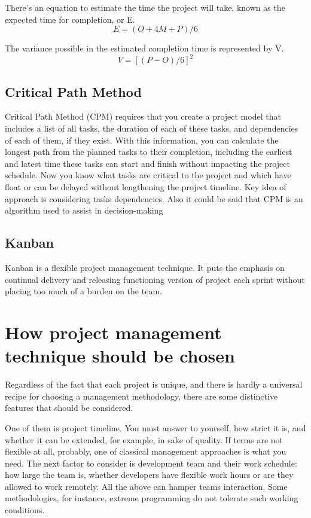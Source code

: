 \documentclass[conference]{IEEEtran}
\begin{document}
    There's an equation to estimate the time the project will take, known as the expected time for completion, or E.
    \begin{equation}
        E=(O + 4M + P)/6\label{eq}
    \end{equation}

    The variance possible in the estimated completion time is represented by V.
    \begin{equation}
        V=[(P - O)/ 6]^2\label{eq}
    \end{equation}

    \subsection{Critical Path Method}\label{subsec:critical-path-method}
    Critical Path Method (CPM) requires that you create a project model that includes a list of all tasks, the duration of each of these tasks, and dependencies of each of them, if they exist.
    With this information, you can calculate the longest path from the planned tasks to their completion, including the earliest and latest time these tasks can start and finish without impacting the project schedule.
    Now you know what tasks are critical to the project and which have float or can be delayed without lengthening the project timeline.
    Key idea of approach is considering tasks dependencies.
    Also it could be said that CPM is an algorithm used to assist in decision-making

    \subsection{Kanban}\label{subsec:kanban}
    Kanban is a flexible project management technique.
    It puts the emphasis on continual delivery and releasing functioning version of project each sprint without placing too much of a burden on the team.

    \section{How project management technique should be chosen}\label{sec:how-project-management-technique-should-be-chosen}
    Regardless of the fact that each project is unique, and there is hardly a universal recipe for choosing a management methodology, there are some distinctive features that should be considered.

    One of them is project timeline.
    You must answer to yourself, how strict it is, and whether it can be extended, for example, in sake of quality.
    If terms are not flexible at all, probably, one of classical management approaches is what you need.
    The next factor to consider is development team and their work schedule: how large the team is, whether developers have flexible work hours or are they allowed to work remotely.
    All the above can hamper teams interaction.
    Some methodologies, for instance, extreme programming \cite{b6} do not tolerate such working conditions.
\end{document}
